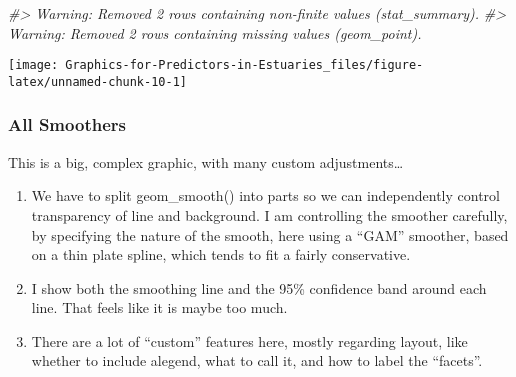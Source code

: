 \documentclass[
]{article}
\newenvironment{Shaded}{\begin{snugshade}}{\end{snugshade}}
\newcommand{\CommentTok}[1]{\textcolor[rgb]{0.56,0.35,0.01}{\textit{#1}}}
\begin{document}
\begin{Shaded}
\begin{Highlighting}[]
\CommentTok{\#\textgreater{} Warning: Removed 2 rows containing non{-}finite values (stat\_summary).}
\CommentTok{\#\textgreater{} Warning: Removed 2 rows containing missing values (geom\_point).}
\end{Highlighting}
\end{Shaded}

\begin{center}\texttt{[image: Graphics-for-Predictors-in-Estuaries\_files/figure-latex/unnamed-chunk-10-1]} \end{center}

\hypertarget{all-smoothers}{%
\subsubsection{All Smoothers}\label{all-smoothers}}

This is a big, complex graphic, with many custom adjustments\ldots{}

\begin{enumerate}
\def\labelenumi{\arabic{enumi}.}
\item
  We have to split geom\_smooth() into parts so we can independently
  control transparency of line and background. I am controlling the
  smoother carefully, by specifying the nature of the smooth, here using
  a ``GAM'' smoother, based on a thin plate spline, which tends to fit a
  fairly conservative.
\item
  I show both the smoothing line and the 95\% confidence band around
  each line. That feels like it is maybe too much.
\item
  There are a lot of ``custom'' features here, mostly regarding layout,
  like whether to include alegend, what to call it, and how to label the
  ``facets''.
\end{enumerate}
\end{document}
